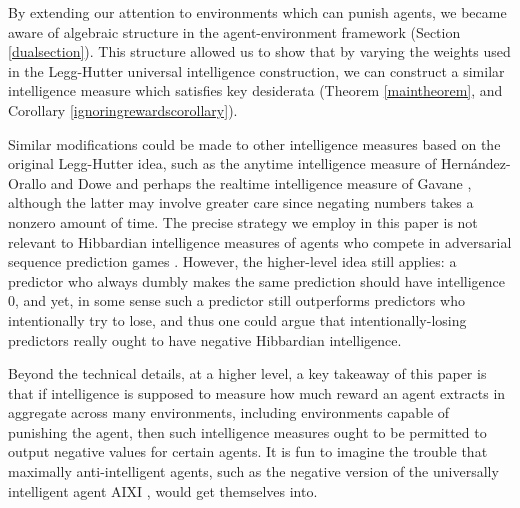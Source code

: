 \documentclass{article}
\begin{document}
By extending our attention to environments which can punish agents,
we became aware of algebraic structure in the agent-environment
framework (Section \ref{dualsection}). This structure allowed us to
show that by varying the weights used in the Legg-Hutter universal
intelligence construction, we can construct a similar intelligence
measure which satisfies key desiderata (Theorem \ref{maintheorem},
and Corollary \ref{ignoringrewardscorollary}).

Similar modifications could be made to other intelligence
measures based on the original Legg-Hutter idea, such as the anytime
intelligence measure of Hern{\'a}ndez-Orallo and Dowe \cite{hernandez}
and perhaps the realtime intelligence measure of Gavane \cite{gavane},
although the latter may involve greater care since negating numbers
takes a nonzero amount of time. The precise strategy we employ in this
paper is not relevant to Hibbardian intelligence measures of agents
who compete in adversarial sequence prediction games
\cite{hibbard} \cite{alexander2021measuring}. However, the higher-level
idea still applies: a predictor who always dumbly
makes the same prediction should have intelligence $0$, and yet, in some sense
such a predictor still outperforms predictors who intentionally try
to lose, and thus one could argue that intentionally-losing predictors
really ought to have negative Hibbardian intelligence.

Beyond the technical details, at a higher level, a key takeaway of
this paper is that if intelligence is supposed to measure how much
reward an agent extracts in aggregate across many environments,
including environments capable of punishing the agent, then such
intelligence measures ought to be permitted to output negative
values for certain agents. It is fun to imagine the trouble
that maximally anti-intelligent
agents, such as the negative version of the universally intelligent
agent AIXI \cite{hutter2004universal}, would get themselves into.




\end{document}
